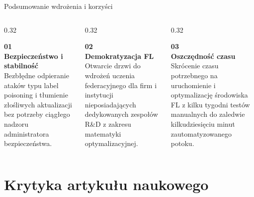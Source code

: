 \documentclass[9pt,aspectratio=169]{beamer}
\newcommand{\sekcjaaktualna}{}
\newcommand{\ustawsekcje}[1]{\renewcommand{\sekcjaaktualna}{#1}}
\begin{document}
\begin{frame}{Podsumowanie wdrożenia i korzyści}
\begin{columns}[T]
\begin{column}{0.32\textwidth}
\begin{cardpurple}
{\LARGE\bfseries\textcolor{primarypurple}{01}}\\[4pt]
\textbf{Bezpieczeństwo i stabilność}\\[4pt]
\footnotesize Bezbłędne odpieranie ataków typu label poisoning i tłumienie złośliwych aktualizacji bez potrzeby ciągłego nadzoru administratora bezpieczeństwa.
\end{cardpurple}
\end{column}
\begin{column}{0.32\textwidth}
\begin{cardgreen}
{\LARGE\bfseries\textcolor{accentgreen}{02}}\\[4pt]
\textbf{Demokratyzacja FL}\\[4pt]
\footnotesize Otwarcie drzwi do wdrożeń uczenia federacyjnego dla firm i instytucji nieposiadających dedykowanych zespołów R\&D z zakresu matematyki optymalizacyjnej.
\end{cardgreen}
\end{column}
\begin{column}{0.32\textwidth}
\begin{cardorange}
{\LARGE\bfseries\textcolor{accentorange}{03}}\\[4pt]
\textbf{Oszczędność czasu}\\[4pt]
\footnotesize Skrócenie czasu potrzebnego na uruchomienie i optymalizację środowiska FL z kilku tygodni testów manualnych do zaledwie kilkudziesięciu minut zautomatyzowanego potoku.
\end{cardorange}
\end{column}
\end{columns}
\end{frame}

\ustawsekcje{Sekcja 3: Krytyka artykułu naukowego}
\section{Krytyka artykułu naukowego}
\end{document}
